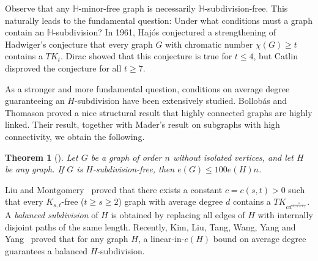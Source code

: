 \documentclass[11pt, a4paper]{article}
\newtheorem{theorem}{Theorem}[section]
\theoremstyle{definition}
\newcommand{\<}{\subseteq}
\begin{document}
Observe that any $\mathbb{H}$-minor-free graph is necessarily $\mathbb{H}$-subdivision-free. This naturally leads to the fundamental question: Under what conditions must a graph contain an $\mathbb{H}$-subdivision? In 1961, Haj\'{o}s \cite{hajos1961uber} conjectured a strengthening of Hadwiger's conjecture that every graph $G$ with chromatic number $\chi(G)\geq t$ contains a $TK_t$. Dirac \cite{Dirac1952} showed that this conjecture is true for $t\leq 4$, but Catlin \cite{Catlin1979}  disproved the conjecture for all $t\geq 7$.
 
As a stronger and more fundamental question, conditions on average degree
 guaranteeing an $H$-subdivision have been extensively studied. Bollob\'{a}s and Thomason 
\cite{Bollobas} proved a nice structural result that highly connected graphs are highly linked. Their result,
together with Mader's result \cite{Mader1967} on subgraphs with high connectivity, we obtain the following. 
\begin{theorem}[\cite{Bollobas,Mader1967}]\label{lem2.1}
    Let $G$ be a graph of order $n$ without isolated vertices, and let $H$ be any graph. If $G$ is $H$-subdivision-free, then $e(G)\leq 100e(H)n$. %
\end{theorem}
 Liu and Montgomery~\cite{liu2017proof} proved that %
there exists a constant  $c=c(s,t)>0$ such that every $K_{s,t}$-free ($t\geq s\geq 2$) graph with average degree $d$ contains a $TK_{cd^{\frac{s}{2(s+1)}}}$.  A \textit{balanced subdivision}  of $H$ is obtained by replacing all edges of $H$ with  internally disjoint paths of the same length. Recently, Kim, Liu, Tang, Wang, Yang and Yang~\cite{yang-sub} proved that for any graph $H$, a
 linear-in-$e(H)$ bound on average degree guarantees a balanced $H$-subdivision. %
\end{document}
